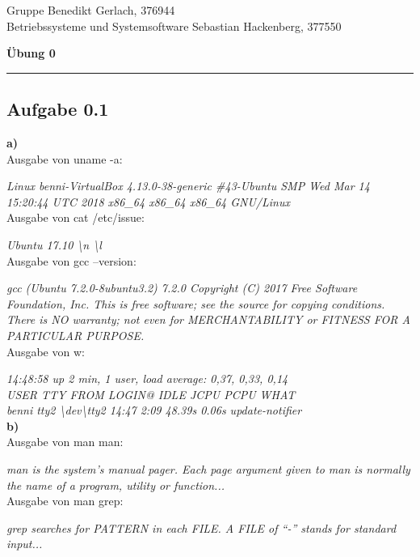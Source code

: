 \documentclass[a4paper,graphics,11pt]{article}
\newcommand{\aufgabe}[1]{\subsection*{Aufgabe #1}}
\begin{document}
\noindent Gruppe              \hfill Benedikt Gerlach, 376944\\
\noindent Betriebssysteme und Systemsoftware       \hfill Sebastian Hackenberg, 377550\\
\begin{center}
	\LARGE{\textbf{Übung 0}}
\end{center}
\begin{center}
\rule[0.1ex]{\textwidth}{1pt}
\end{center}

\aufgabe{0.1}
\textbf{a)}\\

Ausgabe von uname -a:

\textit{Linux benni-VirtualBox 4.13.0-38-generic \#43-Ubuntu SMP Wed Mar 14 15:20:44 UTC 2018 x86\_64 x86\_64 x86\_64 GNU/Linux}\\

Ausgabe von cat /etc/issue:

\textit{Ubuntu 17.10 \textbackslash n \textbackslash l}\\

Ausgabe von gcc --version:

\textit{gcc (Ubuntu 7.2.0-8ubuntu3.2) 7.2.0
Copyright (C) 2017 Free Software Foundation, Inc.
This is free software; see the source for copying conditions.  There is NO
warranty; not even for MERCHANTABILITY or FITNESS FOR A PARTICULAR PURPOSE.}\\

Ausgabe von w:

\textit{14:48:58 up 2 min,  1 user,  load average: 0,37, 0,33, 0,14\\
USER     TTY      FROM             LOGIN@   IDLE   JCPU   PCPU WHAT\\
benni    tty2     \textbackslash dev\textbackslash tty2        14:47    2:09  48.39s  0.06s update-notifier}\\

\textbf{b)}\\

Ausgabe von man man:
 
\textit{man is the system's manual pager.  Each page argument given to  man  is
normally  the  name of a program, utility or function...}\\

Ausgabe von man grep:

\textit{grep  searches  for  PATTERN  in  each  FILE.  A FILE of “-” stands for
standard input...}\\
\end{document}
